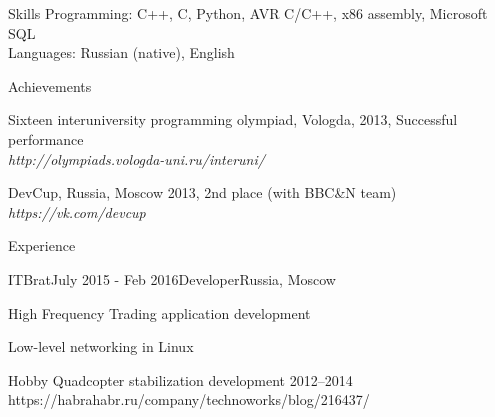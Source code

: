 \documentclass{resume} %
\begin{document}
\begin{rSection}{Skills}
Programming: C++, C, Python, AVR C/C++, x86 assembly, Microsoft SQL\\
Languages: Russian (native), English
\end{rSection}


\begin{rSection}{Achievements}
\item Sixteen interuniversity programming olympiad, Vologda, 2013, Successful performance \\
\hfill {\em http://olympiads.vologda-uni.ru/interuni/}
\item DevCup, Russia, Moscow 2013, 2nd place (with BBC\&N team)\\
\hfill {\em https://vk.com/devcup}
\end{rSection}


\begin{rSection}{Experience}
	
	
	
	\begin{rSubsection}{ITBrat}{July 2015 - Feb 2016}{Developer}{Russia, Moscow}
		\item High Frequency Trading application development
		\item Low-level networking in Linux
	\end{rSubsection}
	
	
\end{rSection}

\begin{rSection}{Hobby}
	Quadcopter stabilization development 2012--2014\\
	https://habrahabr.ru/company/technoworks/blog/216437/
\end{rSection}

\end{document}
